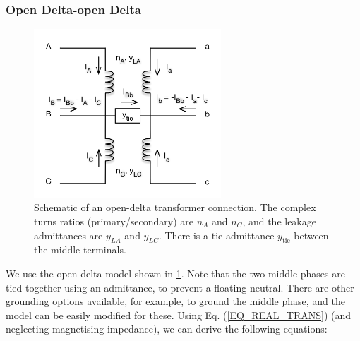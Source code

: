 \documentclass[10pt]{article}
\begin{document}
\subsubsection{Open Delta-open Delta}
\begin{figure}
\begin{center}
\includegraphics[width=7cm]{OpenDelta.png}
\caption{Schematic of an open-delta transformer connection. The complex turns ratios (primary/secondary) are $n_A$ and $n_C$, and the leakage admittances are $y_{LA}$ and $y_{LC}$. There is a tie admittance $y_\text{tie}$ between the middle terminals.}
\label{FIG_OPEN_DELTA}
\end{center}
\end{figure}
We use the open delta model shown in \ref{FIG_OPEN_DELTA}. Note that the two middle phases are tied together using an admittance, to prevent a floating neutral. There are other grounding options available, for example, to ground the middle phase, and the model can be easily modified for these. Using Eq. (\ref{EQ_REAL_TRANS}) (and neglecting magnetising impedance),  we can derive the following equations:
\end{document}
